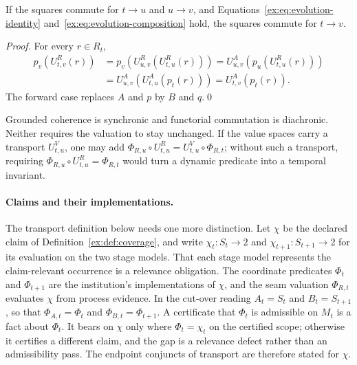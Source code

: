 \documentclass[smallextended,envcountsect,envcountsame,natbib]{svjour3}
\begin{document}
\begin{proposition}\label{ex:prop:commutation-composes}
If the squares commute for $t\to u$ and $u\to v$, and Equations~\eqref{ex:eq:evolution-identity} and~\eqref{ex:eq:evolution-composition} hold, the squares commute for $t\to v$.
\end{proposition}

\begin{proof}
For every $r \in R_t$,
\begin{align*}
p_v(U^R_{t,v}(r))
&=p_v(U^R_{u,v}(U^R_{t,u}(r)))
=U^A_{u,v}(p_u(U^R_{t,u}(r)))\\
&=U^A_{u,v}(U^A_{t,u}(p_t(r)))
=U^A_{t,v}(p_t(r)).
\end{align*}
The forward case replaces $A$ and $p$ by $B$ and $q$.\qed
\end{proof}

Grounded coherence is synchronic and functorial commutation is diachronic. Neither requires the valuation to stay unchanged. If the value spaces carry a transport $U^V_{t,u}$, one may add $\Phi_{R,u} \circ U^R_{t,u}=U^V_{t,u} \circ \Phi_{R,t}$; without such a transport, requiring $\Phi_{R,u} \circ U^R_{t,u}=\Phi_{R,t}$ would turn a dynamic predicate into a temporal invariant.

\paragraph{Claims and their implementations.} The transport definition below needs one more distinction. Let $\chi$ be the declared claim of Definition~\ref{ex:def:coverage}, and write $\chi_t:S_t\to2$ and $\chi_{t+1}:S_{t+1}\to2$ for its evaluation on the two stage models. That each stage model represents the claim-relevant occurrence is a relevance obligation. The coordinate predicates $\Phi_t$ and $\Phi_{t+1}$ are the institution's implementations of $\chi$, and the seam valuation $\Phi_{R,t}$ evaluates $\chi$ from process evidence. In the cut-over reading $A_t=S_t$ and $B_t=S_{t+1}$, so that $\Phi_{A,t}=\Phi_t$ and $\Phi_{B,t}=\Phi_{t+1}$. A certificate that $\Phi_t$ is admissible on $M_t$ is a fact about $\Phi_t$. It bears on $\chi$ only where $\Phi_t=\chi_t$ on the certified scope; otherwise it certifies a different claim, and the gap is a relevance defect rather than an admissibility pass. The endpoint conjuncts of transport are therefore stated for $\chi$.
\end{document}
